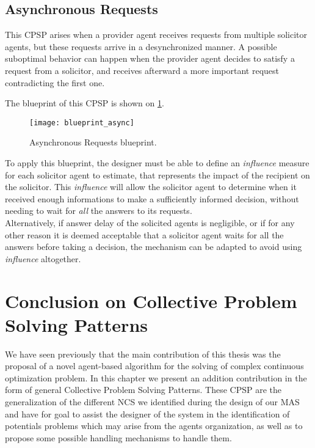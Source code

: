 \subsection{Asynchronous Requests}

This CPSP arises when a provider agent receives requests from multiple solicitor agents, but these requests arrive in a desynchronized manner. A possible suboptimal behavior can happen when the provider agent decides to satisfy a request from a solicitor, and receives afterward a more important request contradicting the first one.

The blueprint of this CPSP is shown on \figurename{} \ref{blueprint_async}.

\begin{figure}
\centering
\texttt{[image: blueprint\_async]}
\caption{Asynchronous Requests blueprint.}\label{blueprint_async}
\end{figure}

To apply this blueprint, the designer must be able to define an \emph{influence} measure for each solicitor agent to estimate, that represents the impact of the recipient on the solicitor. This \emph{influence} will allow the solicitor agent to determine when it received enough informations to make a sufficiently informed decision, without needing to wait for \emph{all} the answers to its requests.\\
Alternatively, if answer delay of the solicited agents is negligible, or if for any other reason it is deemed acceptable that a solicitor agent waits for all the answers before taking a decision, the mechanism can be adapted to avoid using \emph{influence} altogether.

\section{Conclusion on Collective Problem Solving Patterns}

We have seen previously that the main contribution of this thesis was the proposal of a novel agent-based algorithm for the solving of complex continuous optimization problem. In this chapter we present an addition contribution in the form of general Collective Problem Solving Patterns. These CPSP are the generalization of the different NCS we identified during the design of our MAS and have for goal to assist the designer of the system in the identification of potentials problems which may arise from the agents organization, as well as to propose some possible handling mechanisms to handle them.

